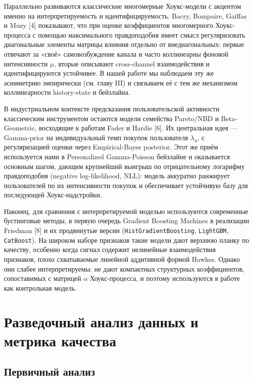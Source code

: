 \documentclass[12pt,a4paper]{article}
\begin{document}
Параллельно развиваются классические многомерные Хоукс-модели с акцентом именно на интерпретируемость и идентифицируемость. Bacry, Bompaire, Gaïffas и Muzy [4] показывают, что при оценке коэффициентов многомерного Хоукс-процесса с помощью максимального правдоподобия имеет смысл регуляризовать диагональные элементы матрицы влияния отдельно от внедиагональных: первые отвечают за «своё» самовозбуждение канала и часто коллинеарны фоновой интенсивности $\mu $, вторые описывают cross-channel взаимодействия и идентифицируются устойчивее. В нашей работе мы наблюдаем эту же асимметрию эмпирически (см. главу III) и связываем её с тем же механизмом коллинеарности history-state и бейзлайна.

В индустриальном контексте предсказания пользовательской активности классическим инструментом остаются модели семейства Pareto/NBD и Beta-Geometric, восходящие к работам Fader и Hardie [6]. Их центральная идея --- Gamma-prior на индивидуальный темп покупок пользователя $\lambda _u$, с регуляризацией оценки через Empirical-Bayes posterior. Этот же приём используется нами в Personalized Gamma-Poisson бейзлайне и оказывается основным шагом, дающим крупнейший выигрыш по отрицательному логарифму правдоподобия (negative log-likelihood, NLL): модель аккуратно ранжирует пользователей по их интенсивности покупок и обеспечивает устойчивую базу для последующей Хоукс-надстройки.

Наконец, для сравнения с интерпретируемой моделью используются современные бустинговые методы, в первую очередь Gradient Boosting Machines в реализации Friedman [8] и их продвинутые версии (\texttt{HistGradientBoosting}, \texttt{LightGBM}, \texttt{CatBoost}). На широком наборе признаков такие модели дают верхнюю планку по качеству, особенно когда сигнал содержит нелинейные взаимодействия признаков, плохо схватываемые линейной аддитивной формой Hawkes. Однако они слабее интерпретируемы: не дают компактных структурных коэффициентов, сопоставимых с матрицей $\alpha $ Хоукс-процесса, и поэтому используются в работе как контрольная модель.

\clearpage
\section{Разведочный анализ данных и метрика качества}

\FloatBarrier
\subsection{Первичный анализ}
\end{document}
